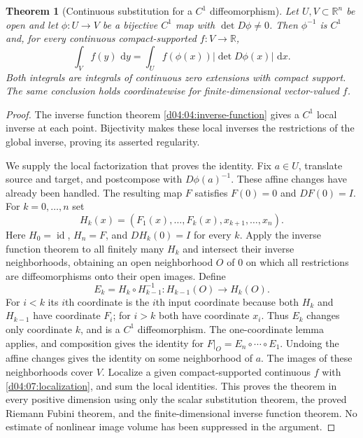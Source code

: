 \documentclass[11pt,oneside,openany]{book}
\newtheorem{theorem}{Theorem}[chapter]
\theoremstyle{definition}
\theoremstyle{remark}
\newcommand{\R}{\mathbb R}
\newcommand{\dd}{\,\mathrm d}
\DeclareMathOperator{\id}{id}
\begin{document}
\begin{theorem}[Continuous substitution for a $C^1$ diffeomorphism]\label{d04:07:continuous-substitution}
Let $U,V\subset\R^n$ be open and let $\phi:U\to V$ be a bijective $C^1$ map with $\det D\phi\ne0$. Then $\phi^{-1}$ is $C^1$ and, for every continuous compact-supported $f:V\to\R$,
\[
 \int_Vf(y)\,\dd y=\int_U f(\phi(x))|\det D\phi(x)|\,\dd x.
\]
Both integrals are integrals of continuous zero extensions with compact support. The same conclusion holds coordinatewise for finite-dimensional vector-valued $f$.
\end{theorem}
\begin{proof}
The inverse function theorem \cref{d04:04:inverse-function} gives a $C^1$ local inverse at each point. Bijectivity makes these local inverses the restrictions of the global inverse, proving its asserted regularity.

We supply the local factorization that proves the identity. Fix $a\in U$, translate source and target, and postcompose with $D\phi(a)^{-1}$. These affine changes have already been handled. The resulting map $F$ satisfies $F(0)=0$ and $DF(0)=I$. For $k=0,\ldots,n$ set
\[
 H_k(x)=(F_1(x),\ldots,F_k(x),x_{k+1},\ldots,x_n).
\]
Here $H_0=\id$, $H_n=F$, and $DH_k(0)=I$ for every $k$. Apply the inverse function theorem to all finitely many $H_k$ and intersect their inverse neighborhoods, obtaining an open neighborhood $O$ of $0$ on which all restrictions are diffeomorphisms onto their open images. Define
\[
 E_k=H_k\circ H_{k-1}^{-1}:H_{k-1}(O)\longrightarrow H_k(O).
\]
For $i<k$ its $i$th coordinate is the $i$th input coordinate because both $H_k$ and $H_{k-1}$ have coordinate $F_i$; for $i>k$ both have coordinate $x_i$. Thus $E_k$ changes only coordinate $k$, and is a $C^1$ diffeomorphism. The one-coordinate lemma applies, and composition gives the identity for
$F|_O=E_n\circ\cdots\circ E_1$. Undoing the affine changes gives the identity on some neighborhood of $a$. The images of these neighborhoods cover $V$. Localize a given compact-supported continuous $f$ with \cref{d04:07:localization}, and sum the local identities. This proves the theorem in every positive dimension using only the scalar substitution theorem, the proved Riemann Fubini theorem, and the finite-dimensional inverse function theorem. No estimate of nonlinear image volume has been suppressed in the argument.
\end{proof}
\end{document}
